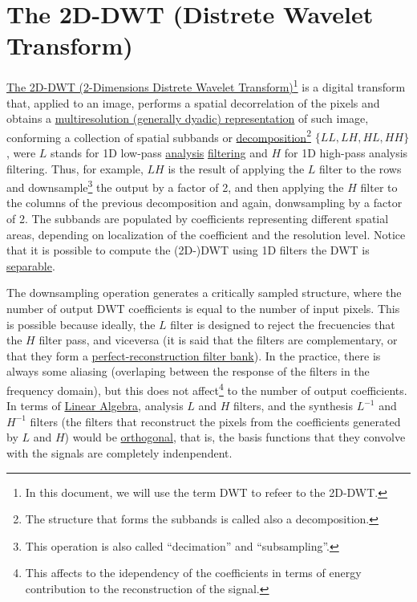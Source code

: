 
\section{The 2D-DWT (Distrete Wavelet Transform)}

\href{https://vicente-gonzalez-ruiz.github.io/image_transformations_for_coding/#x1-3100020}{The
  2D-DWT (2-Dimensions Distrete Wavelet Transform)\footnote{In this
    document, we will use the term DWT to refeer to the 2D-DWT.}} is a
digital transform that, applied to an image, performs a spatial
decorrelation of the pixels and obtains a
\href{https://vicente-gonzalez-ruiz.github.io/image_transformations_for_coding/index.html#x1-3500024}{multiresolution
  (generally dyadic) representation} of such image, conforming a
collection of spatial subbands or
\href{https://en.wikipedia.org/wiki/Sub-band_coding}{decomposition}\footnote{The
  structure that forms the subbands is called also a decomposition.}
$\{LL, LH, HL, HH\}$, were $L$ stands for 1D low-pass
\href{https://en.wikipedia.org/wiki/Filter_bank}{analysis}
\href{https://en.wikipedia.org/wiki/Filter_(signal_processing)}{filtering}
and $H$ for 1D high-pass analysis filtering. Thus, for example, $LH$
is the result of applying the $L$ filter to the rows and
downsample\footnote{This operation is also called ``decimation'' and
  ``subsampling''.} the output by a factor of 2, and then applying the
$H$ filter to the columns of the previous decomposition and again,
donwsampling by a factor of 2. The subbands are populated by
coefficients representing different spatial areas, depending on
localization of the coefficient and the resolution level. Notice that
it is possible to compute the (2D-)DWT using 1D filters the DWT is
\href{http://home.ustc.edu.cn/~xuedixiu/image.ustc/course/dip/DIP14-ch3.pdf}{separable}.

The downsampling operation generates a critically sampled structure,
where the number of output DWT coefficients is equal to the number of
input pixels. This is possible because ideally, the $L$ filter is
designed to reject the frecuencies that the $H$ filter pass, and
viceversa (it is said that the filters are complementary, or that they
form a
\href{https://en.wikipedia.org/wiki/Filter_bank#Perfect_reconstruction_filter_banks}{perfect-reconstruction
  filter bank}). In the practice, there is always some aliasing
(overlaping between the response of the filters in the frequency
domain), but this does not affect\footnote{This affects to the
  idependency of the coefficients in terms of energy contribution to
  the reconstruction of the signal.} to the number of output
coefficients. In terms of
\href{https://en.wikipedia.org/wiki/Linear_algebra}{Linear Algebra},
analysis $L$ and $H$ filters, and the synthesis $L^{-1}$ and $H^{-1}$
filters (the filters that reconstruct the pixels from the coefficients
generated by $L$ and $H$) would be
\href{https://en.wikipedia.org/wiki/Orthogonality}{orthogonal}, that
is, the basis functions that they convolve with the signals are
completely indenpendent.

